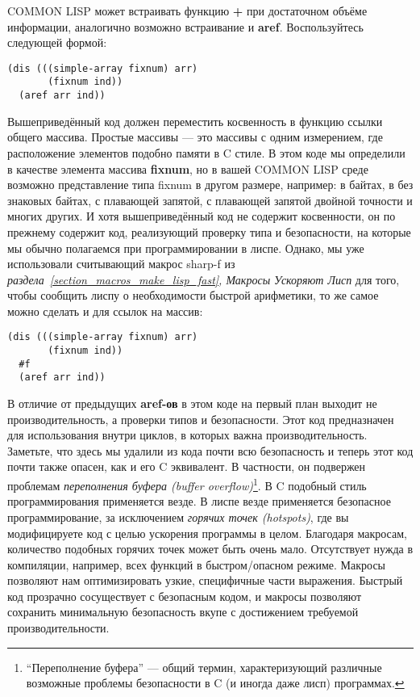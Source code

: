 COMMON LISP может встраивать функцию \textbf{+} при достаточном объёме информации, аналогично возможно встраивание и \textbf{aref}. Воспользуйтесь следующей формой:

\begin{verbatim}
(dis (((simple-array fixnum) arr)
       (fixnum ind))
  (aref arr ind))
\end{verbatim}

Вышеприведённый код должен переместить косвенность в функцию ссылки общего массива. Простые массивы --- это массивы с одним измерением, где расположение элементов подобно памяти в C стиле. В этом коде мы определили в качестве элемента массива \textbf{fixnum}, но в вашей COMMON LISP среде возможно представление типа fixnum в другом размере, например: в байтах, в без знаковых байтах, с плавающей запятой, с плавающей запятой двойной точности и многих других. И хотя вышеприведённый код не содержит косвенности, он по прежнему содержит код, реализующий проверку типа и безопасности, на которые мы обычно полагаемся при программировании в лиспе. Однако, мы уже использовали считывающий макрос sharp-f из \emph{раздела~\ref{section_macros_make_lisp_fast}, Макросы Ускоряют Лисп} для того, чтобы сообщить лиспу о необходимости быстрой арифметики, то же самое можно сделать и для ссылок на массив:

\begin{verbatim}
(dis (((simple-array fixnum) arr)
       (fixnum ind))
  #f
  (aref arr ind))
\end{verbatim}

В отличие от предыдущих \textbf{aref-ов} в этом коде на первый план выходит не производительность, а проверки типов и безопасности. Этот код предназначен для использования внутри циклов, в которых важна производительность. Заметьте, что здесь мы удалили из кода почти всю безопасность и теперь этот код почти также опасен, как и его C эквивалент. В частности, он подвержен проблемам \emph{переполнения буфера (buffer overflow)}\footnote{``Переполнение буфера'' --- общий термин, характеризующий различные возможные проблемы безопасности в C (и иногда даже лисп) программах.}. В C подобный стиль программирования применяется везде. В лиспе везде применяется безопасное программирование, за исключением \emph{горячих точек (hotspots)}, где вы модифицируете код с целью ускорения программы в целом. Благодаря макросам, количество подобных горячих точек может быть очень мало. Отсутствует нужда в компиляции, например, всех функций в быстром/опасном режиме. Макросы позволяют нам оптимизировать узкие, специфичные части выражения. Быстрый код прозрачно сосуществует с безопасным кодом, и макросы позволяют сохранить минимальную безопасность вкупе с достижением требуемой производительности.

